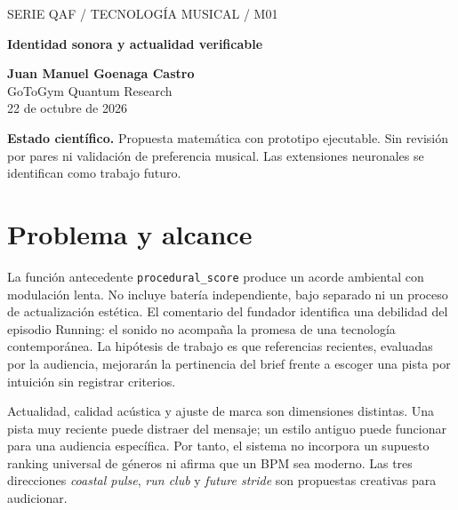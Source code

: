 \documentclass[11pt,a4paper]{article}
\begin{document}
\begin{center}{\sffamily\small\textcolor{mint}{SERIE QAF / TECNOLOGÍA MUSICAL / M01}}\par\vspace{8pt}
{\sffamily\LARGE\bfseries\textcolor{ink}{Identidad sonora y actualidad verificable}}\par\vspace{10pt}
\textbf{Juan Manuel Goenaga Castro}\\GoToGym Quantum Research\\22 de octubre de 2026
\end{center}
\colorbox{ink!6}{\parbox{.96\linewidth}{\small\textbf{Estado científico.} Propuesta matemática con prototipo ejecutable. Sin revisión por pares ni validación de preferencia musical. Las extensiones neuronales se identifican como trabajo futuro.}}
\begin{abstract}
Se transforma la observación del usuario, ``la música no suena actual'', en un problema falsable de selección contextual. El prototipo calcula un perfil a partir de referencias fechadas y compara candidatos por atributos y una interacción energía-densidad. La salida es una decisión auditable, no una estimación automática de popularidad. El objetivo es reducir el desajuste entre marca, audiencia y música sin confundir preferencia personal con una tendencia global. El módulo implementado conserva la región diagonal del estado QAF y un control clásico equivalente.
\end{abstract}
\section{Problema y alcance}
La función antecedente \texttt{procedural\_score} produce un acorde ambiental con modulación lenta. No incluye batería independiente, bajo separado ni un proceso de actualización estética. El comentario del fundador identifica una debilidad del episodio Running: el sonido no acompaña la promesa de una tecnología contemporánea. La hipótesis de trabajo es que referencias recientes, evaluadas por la audiencia, mejorarán la pertinencia del brief frente a escoger una pista por intuición sin registrar criterios.

Actualidad, calidad acústica y ajuste de marca son dimensiones distintas. Una pista muy reciente puede distraer del mensaje; un estilo antiguo puede funcionar para una audiencia específica. Por tanto, el sistema no incorpora un supuesto ranking universal de géneros ni afirma que un BPM sea moderno. Las tres direcciones \emph{coastal pulse}, \emph{run club} y \emph{future stride} son propuestas creativas para audicionar.
\end{document}
